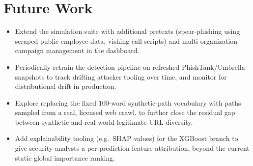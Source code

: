 \documentclass[11pt,a4paper]{report}
\begin{document}
\section{Future Work}
\begin{itemize}[leftmargin=1.4em]
  \item Extend the simulation suite with additional pretexts (spear-phishing using
  scraped public employee data, vishing call scripts) and multi-organization
  campaign management in the dashboard.
  \item Periodically retrain the detection pipeline on refreshed PhishTank/Umbrella
  snapshots to track drifting attacker tooling over time, and monitor for
  distributional drift in production.
  \item Explore replacing the fixed 100-word synthetic-path vocabulary with paths
  sampled from a real, licensed web crawl, to further close the residual gap between
  synthetic and real-world legitimate URL diversity.
  \item Add explainability tooling (e.g.\ SHAP values) for the XGBoost branch to
  give security analysts a per-prediction feature attribution, beyond the current
  static global importance ranking.
\end{itemize}
\end{document}

